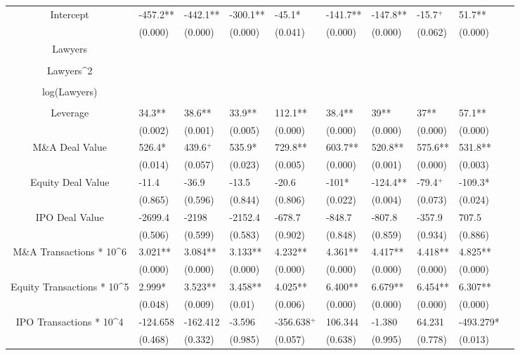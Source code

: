 \documentclass{article}
\begin{document}
\begin{table}[H]
\begin{tabular}{|clllllllll|}
Intercept & -457.2** & -442.1** & -300.1** & -45.1* & -141.7** & -147.8** & -15.7$^{+}$ & 51.7** & \\
   & (0.000) & (0.000) & (0.000) & (0.041) & (0.000) & (0.000) & (0.062) & (0.000) & \\
  Lawyers &  &  &  &  &  &  &  &  & \\
   &  &  &  &  &  &  &  &  & \\
  Lawyers^2 &  &  &  &  &  &  &  &  & \\
   &  &  &  &  &  &  &  &  & \\
  log(Lawyers) &  &  &  &  &  &  &  &  & \\
   &  &  &  &  &  &  &  &  & \\
  Leverage & 34.3** & 38.6** & 33.9** & 112.1** & 38.4** & 39** & 37** & 57.1** & \\
   & (0.002) & (0.001) & (0.005) & (0.000) & (0.000) & (0.000) & (0.000) & (0.000) & \\
  M\&A Deal Value & 526.4* & 439.6$^{+}$ & 535.9* & 729.8** & 603.7** & 520.8** & 575.6** & 531.8** & \\
   & (0.014) & (0.057) & (0.023) & (0.005) & (0.000) & (0.001) & (0.000) & (0.003) & \\
  Equity Deal Value & -11.4 & -36.9 & -13.5 & -20.6 & -101* & -124.4** & -79.4$^{+}$ & -109.3* & \\
   & (0.865) & (0.596) & (0.844) & (0.806) & (0.022) & (0.004) & (0.073) & (0.024) & \\
  IPO Deal Value & -2699.4 & -2198 & -2152.4 & -678.7 & -848.7 & -807.8 & -357.9 & 707.5 & \\
   & (0.506) & (0.599) & (0.583) & (0.902) & (0.848) & (0.859) & (0.934) & (0.886) & \\
  M\&A Transactions * 10^6 & 3.021** & 3.084** & 3.133** & 4.232** & 4.361** & 4.417** & 4.418** & 4.825** & \\
   & (0.000) & (0.000) & (0.000) & (0.000) & (0.000) & (0.000) & (0.000) & (0.000) & \\
  Equity Transactions * 10^5 & 2.999* & 3.523** & 3.458** & 4.025** & 6.400** & 6.679** & 6.454** & 6.307** & \\
   & (0.048) & (0.009) & (0.01) & (0.006) & (0.000) & (0.000) & (0.000) & (0.000) & \\
  IPO Transactions * 10^4 & -124.658 & -162.412 & -3.596 & -356.638$^{+}$ & 106.344 & -1.380 & 64.231 & -493.279* & \\
   & (0.468) & (0.332) & (0.985) & (0.057) & (0.638) & (0.995) & (0.778) & (0.013) & \\

\end{tabular}
\end{table}
\end{document}
